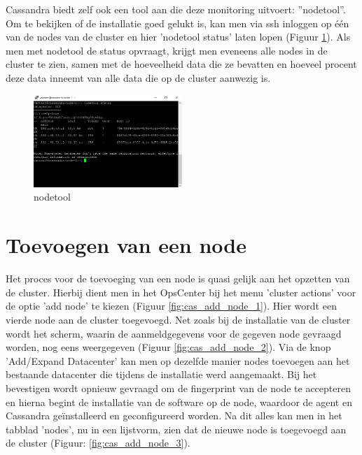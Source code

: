 Cassandra biedt zelf ook een tool aan die deze monitoring uitvoert: ''nodetool''.
Om te bekijken of de installatie goed gelukt is, kan men via ssh inloggen op één van de nodes van de cluster en hier 'nodetool status' laten lopen (Figuur \ref{fig:cas_nodetool}).
Als men met nodetool de status opvraagt, krijgt men eveneens alle nodes in de cluster te zien, samen met de hoeveelheid data die ze bevatten en hoeveel procent deze data inneemt van alle data die op de cluster aanwezig is.

\begin{figure}[H]
	\centering
	\includegraphics[width=0.5\textwidth]{img/4_installatie_cassandra/3_Node_setup}
	\caption{nodetool}
	\label{fig:cas_nodetool}
\end{figure}

\section{Toevoegen van een node}
Het proces voor de toevoeging van een node is quasi gelijk aan het opzetten van de cluster.
Hierbij dient men in het OpsCenter bij het menu 'cluster actions' voor de optie 'add node' te kiezen (Figuur \ref{fig:cas_add_node_1}).
Hier wordt een vierde node aan de cluster toegevoegd.
Net zoals bij de installatie van de cluster wordt het scherm, waarin de aanmeldgegevens voor de gegeven node gevraagd worden, nog eens weergegeven (Figuur \ref{fig:cas_add_node_2}). 
Via de knop 'Add/Expand Datacenter' kan men op dezelfde manier nodes toevoegen aan het bestaande datacenter die tijdens de installatie werd aangemaakt.
Bij het bevestigen wordt opnieuw gevraagd om de fingerprint van de node te accepteren en hierna begint de installatie van de software op de node, waardoor de agent en Cassandra geïnstalleerd en geconfigureerd worden.
Na dit alles kan men in het tabblad 'nodes', nu in een lijstvorm, zien dat de nieuwe node is toegevoegd aan de cluster (Figuur: \ref{fig:cas_add_node_3}).

